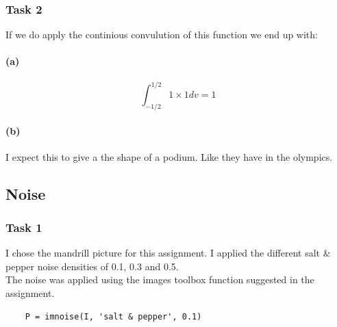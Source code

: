 \documentclass{article}
\begin{document}
\subsubsection*{Task 2}
If we do apply the continious convulution of this function we end up with:

\paragraph{(a)}
\begin{equation}
	\int_{-1/2}^{1/2} 1 \times 1 {d}v = 1
\end{equation}

\paragraph{(b)}
I expect this to give a the shape of a podium. Like they have in the olympics.

\newpage
\subsection*{Noise}
\subsubsection*{Task 1}

I chose the mandrill picture for this assignment. I applied the different salt \& pepper noise densities of 0.1, 0.3 and 0.5. \\
The noise was applied using the images toolbox function suggested in the assignment.
\begin{lstlisting}
	P = imnoise(I, 'salt & pepper', 0.1)
\end{lstlisting}
\end{document}
